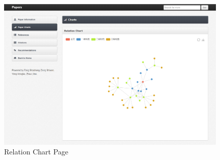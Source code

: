 \documentclass{book}
\begin{document}
\begin{figure}[H]
\centering
\includegraphics[width=11cm]{img/zlt_rel_demo.png}
\caption{Relation Chart Page}
\end{figure}
\end{document}
